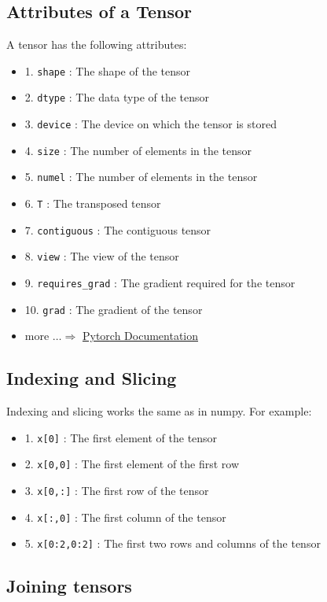 \documentclass{article}
\begin{document}
\subsection{Attributes of a Tensor}

A tensor has the following attributes:
\begin{itemize}
    \item 1. \texttt{shape} : The shape of the tensor
    \item 2. \texttt{dtype} : The data type of the tensor
    \item 3. \texttt{device} : The device on which the tensor is stored
    \item 4. \texttt{size} : The number of elements in the tensor
    \item 5. \texttt{numel} : The number of elements in the tensor
    \item 6. \texttt{T} : The transposed tensor
    \item 7. \texttt{contiguous} : The contiguous tensor
    \item 8. \texttt{view} : The view of the tensor
    \item 9. \texttt{requires\_grad} : The gradient required for the tensor
    \item 10. \texttt{grad} : The gradient of the tensor
    \item more $\dots \Rightarrow$ \href{https://pytorch.org/docs/stable/tensors.html}{Pytorch Documentation}
\end{itemize}

\subsection{Indexing and Slicing}

Indexing and slicing works the same as in numpy. For example:
\begin{itemize}
    \item 1. \texttt{x[0]} : The first element of the tensor
    \item 2. \texttt{x[0,0]} : The first element of the first row
    \item 3. \texttt{x[0,:]} : The first row of the tensor
    \item 4. \texttt{x[:,0]} : The first column of the tensor
    \item 5. \texttt{x[0:2,0:2]} : The first two rows and columns of the tensor
\end{itemize}

\subsection{Joining tensors}
\end{document}
